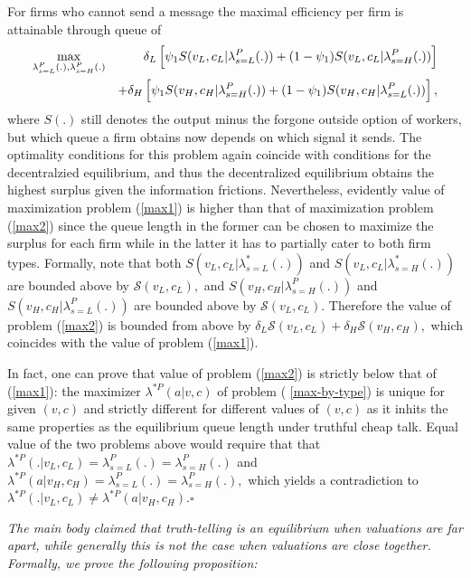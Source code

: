 \documentclass[12pt]{article}
\theoremstyle{plain}
\begin{document}
For firms who cannot send a message the maximal efficiency per firm is
attainable through queue of 
\begin{eqnarray}
\max_{\lambda _{s=L}^{P}(.),\lambda _{s=H}^{P}(.)} &&\delta _{L}\left[ \psi
_{1}S(v_{L},c_{L}|\lambda _{s=L}^{P}(.))+(1-\psi _{1})S(v_{L},c_{L}|\lambda
_{s=H}^{P}(.))\right]  \label{max2} \\
&&+\delta _{H}\left[ \psi _{1}S(v_{H},c_{H}|\lambda _{s=H}^{P}(.))+(1-\psi
_{1})S(v_{H},c_{H}|\lambda _{s=L}^{P}(.))\right] ,  \notag
\end{eqnarray}%
where $S(.)$ still denotes the output minus the forgone outside option of
workers, but which queue a firm obtains now depends on which signal it
sends. The optimality conditions for this problem again coincide with
conditions for the decentralzied equilibrium, and thus the decentralized
equilibrium obtains the highest surplus given the information frictions.
Nevertheless, evidently value of maximization problem (\ref{max1}) is higher
than that of maximization problem (\ref{max2}) since the queue length in the
former can be chosen to maximize the surplus for each firm while in the
latter it has to partially cater to both firm types. Formally, note that
both $S(v_{L},c_{L}|\lambda _{s=L}^{\ast }(.))$ and $S(v_{L},c_{L}|\lambda
_{s=H}^{\ast }(.))$ are bounded above by $\mathcal{S}(v_{L},c_{L}),$ and $%
S(v_{H},c_{H}|\lambda _{s=H}^{P}(.))$ and $S(v_{H},c_{H}|\lambda
_{s=L}^{P}(.))$ are bounded above by $\mathcal{S}(v_{L},c_{L}).$ Therefore
the value of problem (\ref{max2}) is bounded from above by $\delta _{L}%
\mathcal{S}(v_{L},c_{L})+\delta _{H}\mathcal{S}(v_{H},c_{H}),$ which
coincides with the value of problem (\ref{max1}).

In fact, one can prove that value of problem (\ref{max2}) is strictly below
that of (\ref{max1}): the maximizer $\lambda ^{\ast P}(a|v,c)$ of problem (%
\ref{max-by-type}) is unique for given $(v,c)$ and strictly different for
different values of $(v,c)$ as it inhits the same properties as the
equilibrium queue length under truthful cheap talk. Equal value of the two
problems above would require that that $\lambda ^{\ast
P}(.|v_{L},c_{L})=\lambda _{s=L}^{P}(.)=\lambda _{s=H}^{P}(.)\,\ $and $%
\lambda ^{\ast P}(a|v_{H},c_{H})=\lambda _{s=L}^{P}(.)=\lambda
_{s=H}^{P}(.), $ which yields a contradiction to $\lambda ^{\ast
P}(.|v_{L},c_{L})\neq \lambda ^{\ast P}(a|v_{H},c_{H}).\square $

\bigskip \bigskip

\noindent \textit{The main body claimed that truth-telling is an equilibrium when
valuations are far apart, while generally this is not the case when
valuations are close together. Formally, we prove the following proposition: 
}
\end{document}
